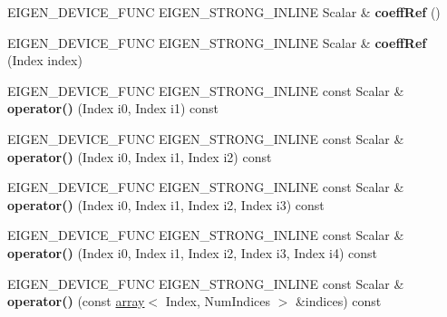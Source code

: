 \begin{DoxyCompactItemize}
\mbox{\label{class_eigen_1_1_tensor_ade3fea6870c753611d94ad7cda134d08}} 
E\+I\+G\+E\+N\+\_\+\+D\+E\+V\+I\+C\+E\+\_\+\+F\+U\+NC E\+I\+G\+E\+N\+\_\+\+S\+T\+R\+O\+N\+G\+\_\+\+I\+N\+L\+I\+NE Scalar \& {\bfseries coeff\+Ref} ()
\item 
\mbox{\label{class_eigen_1_1_tensor_a66dd2792186fd155fdd43879e7d08c0b}} 
E\+I\+G\+E\+N\+\_\+\+D\+E\+V\+I\+C\+E\+\_\+\+F\+U\+NC E\+I\+G\+E\+N\+\_\+\+S\+T\+R\+O\+N\+G\+\_\+\+I\+N\+L\+I\+NE Scalar \& {\bfseries coeff\+Ref} (Index index)
\item 
\mbox{\label{class_eigen_1_1_tensor_a5e8e608cfaa7d621f603cb7ace9d8df0}} 
E\+I\+G\+E\+N\+\_\+\+D\+E\+V\+I\+C\+E\+\_\+\+F\+U\+NC E\+I\+G\+E\+N\+\_\+\+S\+T\+R\+O\+N\+G\+\_\+\+I\+N\+L\+I\+NE const Scalar \& {\bfseries operator()} (Index i0, Index i1) const
\item 
\mbox{\label{class_eigen_1_1_tensor_a46be5bbd964515a4eadd5823eb411710}} 
E\+I\+G\+E\+N\+\_\+\+D\+E\+V\+I\+C\+E\+\_\+\+F\+U\+NC E\+I\+G\+E\+N\+\_\+\+S\+T\+R\+O\+N\+G\+\_\+\+I\+N\+L\+I\+NE const Scalar \& {\bfseries operator()} (Index i0, Index i1, Index i2) const
\item 
\mbox{\label{class_eigen_1_1_tensor_a4f4188e0a57cfa3cc3045a63cac0d4e6}} 
E\+I\+G\+E\+N\+\_\+\+D\+E\+V\+I\+C\+E\+\_\+\+F\+U\+NC E\+I\+G\+E\+N\+\_\+\+S\+T\+R\+O\+N\+G\+\_\+\+I\+N\+L\+I\+NE const Scalar \& {\bfseries operator()} (Index i0, Index i1, Index i2, Index i3) const
\item 
\mbox{\label{class_eigen_1_1_tensor_ac245b695cfa23d0bd55da9a45fa631ae}} 
E\+I\+G\+E\+N\+\_\+\+D\+E\+V\+I\+C\+E\+\_\+\+F\+U\+NC E\+I\+G\+E\+N\+\_\+\+S\+T\+R\+O\+N\+G\+\_\+\+I\+N\+L\+I\+NE const Scalar \& {\bfseries operator()} (Index i0, Index i1, Index i2, Index i3, Index i4) const
\item 
\mbox{\label{class_eigen_1_1_tensor_a8536695d70e710a6825280b1cfe6cf85}} 
E\+I\+G\+E\+N\+\_\+\+D\+E\+V\+I\+C\+E\+\_\+\+F\+U\+NC E\+I\+G\+E\+N\+\_\+\+S\+T\+R\+O\+N\+G\+\_\+\+I\+N\+L\+I\+NE const Scalar \& {\bfseries operator()} (const \hyperlink{class_eigen_1_1array}{array}$<$ Index, Num\+Indices $>$ \&indices) const

\end{DoxyCompactItemize}

